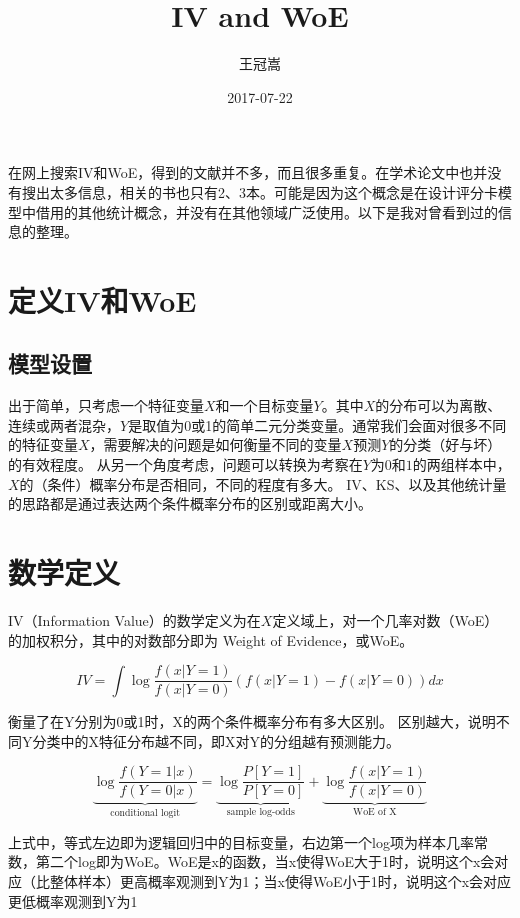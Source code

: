 \documentclass[a4paper,UTF8]{ctexart}
\begin{document}
\title{IV and WoE}
\author{王冠嵩}
\date{2017-07-22}
\maketitle

在网上搜索IV和WoE，得到的文献并不多，而且很多重复。在学术论文中也并没有搜出太多信息，相关的书也只有2、3本。可能是因为这个概念是在设计评分卡模型中借用的其他统计概念，并没有在其他领域广泛使用。以下是我对曾看到过的信息的整理。

\section{定义IV和WoE}

\subsection{模型设置}

出于简单，只考虑一个特征变量$X$和一个目标变量$Y$。其中$X$的分布可以为离散、连续或两者混杂，$Y$是取值为0或1的简单二元分类变量。通常我们会面对很多不同的特征变量$X$，需要解决的问题是如何衡量不同的变量$X$预测$Y$的分类（好与坏）的有效程度。
从另一个角度考虑，问题可以转换为考察在$Y$为$0$和$1$的两组样本中，$X$的（条件）概率分布是否相同，不同的程度有多大。
IV、KS、以及其他统计量的思路都是通过表达两个条件概率分布的区别或距离大小。 

\section{数学定义}
IV（Information Value）的数学定义为在$X$定义域上，对一个几率对数（WoE）的加权积分，其中的对数部分即为 Weight of Evidence，或WoE。

\begin{equation} 
 IV = \int \log \frac{f(x|Y=1)}{f(x|Y=0)} (f(x|Y=1) - f(x|Y=0)) dx 
\end{equation}

衡量了在Y分别为0或1时，X的两个条件概率分布有多大区别。 区别越大，说明不同Y分类中的X特征分布越不同，即X对Y的分组越有预测能力。

\begin{equation}
\underbrace{\log \frac{f(Y=1|x)}{f(Y=0|x)}}_{\text{conditional logit}} =
\underbrace{\log \frac{P[Y=1]}{P[Y=0]}}_{\text{sample log-odds}} + 
\underbrace{\log \frac{f(x|Y=1)}{f(x|Y=0)}}_{\text{WoE of X}}
\end{equation}

 上式中，等式左边即为逻辑回归中的目标变量，右边第一个log项为样本几率常数，第二个log即为WoE。WoE是x的函数，当x使得WoE大于1时，说明这个x会对应（比整体样本）更高概率观测到Y为1；当x使得WoE小于1时，说明这个x会对应更低概率观测到Y为1
 
\end{document}
